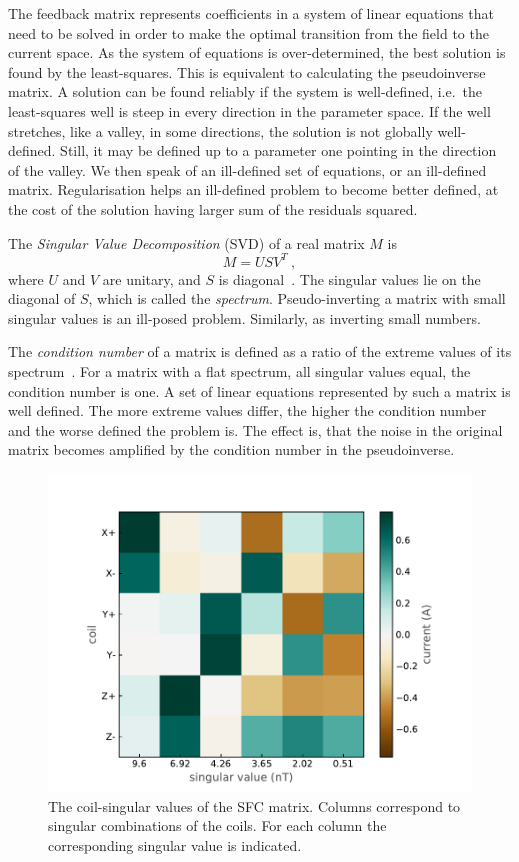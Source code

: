 The feedback matrix represents coefficients in a system of linear equations that need to be solved in order to make the optimal transition from the field to the current space. As the system of equations is over-determined, the best solution is found by the least-squares. This is equivalent to calculating the pseudoinverse matrix. A solution can be found reliably if the system is well-defined, i.e.\ the least-squares well is steep in every direction in the parameter space. If the well stretches, like a valley, in some directions, the solution is not globally well-defined. Still, it may be defined up to a parameter one pointing in the direction of the valley. We then speak of an ill-defined set of equations, or an ill-defined matrix. Regularisation helps an ill-defined problem to become better defined, at the cost of the solution having larger sum of the residuals squared.

The \emph{Singular Value Decomposition} (SVD) of a real matrix $M$ is
\begin{equation}
  M = U S V^T \ , 
\end{equation}
where $U$ and $V$ are unitary, and $S$ is diagonal~\cite{Golub1965}. The singular values lie on the diagonal of $S$, which is called the \emph{spectrum}. 
Pseudo-inverting a matrix with small singular values is an ill-posed problem. Similarly, as inverting small numbers.

The \emph{condition number} of a matrix is defined as a ratio of the extreme values of its spectrum~\cite{Regression}. For a matrix with a flat spectrum, all singular values equal, the condition number is one. A set of linear equations represented by such a matrix is well defined. The more extreme values differ, the higher the condition number and the worse defined the problem is. The effect is, that the noise in the original matrix becomes amplified by the condition number in the pseudoinverse.

\begin{figure}
  \centering
  \includegraphics[width=.8\linewidth]{gfx/nEDM_SFC/coil-singular_vectors_of_the_nEDM_SFC_matrix.pdf}
  \caption{The coil-singular values of the SFC matrix. Columns correspond to singular combinations of the coils. For each column the corresponding singular value is indicated.}\label{fig:nEDM_SFC_svd}
\end{figure}

